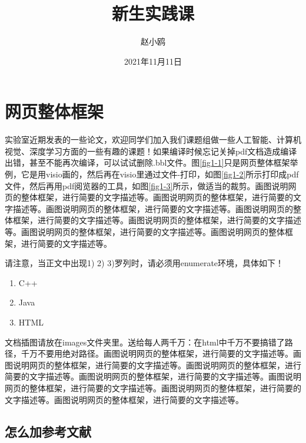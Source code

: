 \documentclass[supercite]{Experimental_Report}
\title{~~~~~~新生实践课~~~~~~}
\author{赵小鸥}
\date{2021年11月11日}
\theoremstyle{definition}
\begin{document}
\maketitle

\clearpage


\tableofcontents[level=2]

\clearpage


\section{网页整体框架}

实验室近期发表的一些论文\cite{Li2022AAAI, Chen2021MMA, Chen2022IMC, Ren2021JVCI, Ren2022MTAP}，欢迎同学们加入我们课题组做一些人工智能、计算机视觉、深度学习方面的一些有趣的课题！如果编译时候忘记关掉pdf文档造成编译出错，甚至不能再次编译，可以试试删除.bbl文件。图\ref{fig1-1}只是网页整体框架举例，它是用visio画的，然后再在visio里通过文件-打印，如图\ref{fig1-2}所示打印成pdf文件，然后再用pdf阅览器的工具，如图\ref{fig1-3}所示，做适当的裁剪。画图说明网页的整体框架，进行简要的文字描述等。画图说明网页的整体框架，进行简要的文字描述等。画图说明网页的整体框架，进行简要的文字描述等。画图说明网页的整体框架，进行简要的文字描述等。画图说明网页的整体框架，进行简要的文字描述等。画图说明网页的整体框架，进行简要的文字描述等。画图说明网页的整体框架，进行简要的文字描述等。

请注意，当正文中出现1) 2) 3)罗列时，请必须用enumerate环境，具体如下！

\begin{enumerate}
	\renewcommand{\labelenumi}{\theenumi)}
	\item C++
	\item Java
	\item HTML
\end{enumerate}

文档插图请放在images文件夹里。送给每人两千万：在html中千万不要搞错了路径，千万不要用绝对路径。画图说明网页的整体框架，进行简要的文字描述等。画图说明网页的整体框架，进行简要的文字描述等。画图说明网页的整体框架，进行简要的文字描述等。画图说明网页的整体框架，进行简要的文字描述等。画图说明网页的整体框架，进行简要的文字描述等。画图说明网页的整体框架，进行简要的文字描述等。画图说明网页的整体框架，进行简要的文字描述等。

\subsection{怎么加参考文献}
\end{document}
